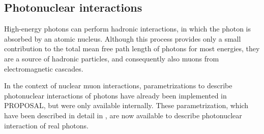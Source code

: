 \subsection{Photonuclear interactions}

High-energy photons can perform hadronic interactions, in which the photon is absorbed by an atomic nucleus.
Although this process provides only a small contribution to the total mean free path length of photons for most energies, they are a source of hadronic particles, and consequently also muons from electromagnetic cascades.

In the context of nuclear muon interactions, parametrizations to describe photonuclear interactions of photons have already been implemented in PROPOSAL, but were only available internally.
These parametrization, which have been described in detail in \cite{KOEHNE20132070}, are now available to describe photonuclear interaction of real photons.

